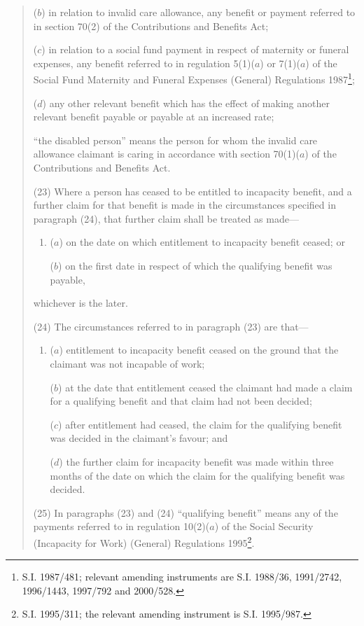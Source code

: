 \documentclass[12pt,a4paper]{article}
\begin{document}
\begin{enumerate}
\begin{quotation}
\begin{enumerate}
\begin{enumerate}
($b$) 
in relation to invalid care allowance, any benefit or payment referred to in section 70(2) of the Contributions and Benefits Act;

($c$) 
in relation to a social fund payment in respect of maternity or funeral expenses, any benefit referred to in regulation 5(1)($a$)  or 7(1)($a$)  of the Social Fund Maternity and Funeral Expenses (General) Regulations 1987\footnote{\frenchspacing S.I. 1987/481; relevant amending instruments are S.I. 1988/36, 1991/2742, 1996/1443, 1997/792 and 2000/528.};

($d$) 
any other relevant benefit which has the effect of making another relevant benefit payable or payable at an increased rate;
\end{enumerate}

“the disabled person” means the person for whom the invalid care allowance claimant is caring in accordance with section 70(1)($a$)  of the Contributions and Benefits Act.
\end{enumerate}

(23) Where a person has ceased to be entitled to incapacity benefit, and a further claim for that benefit is made in the circumstances specified in paragraph (24), that further claim shall be treated as made—
\begin{enumerate}\item[]
($a$) on the date on which entitlement to incapacity benefit ceased; or

($b$) on the first date in respect of which the qualifying benefit was payable,
\end{enumerate}
whichever is the later.

(24) The circumstances referred to in paragraph (23) are that—
\begin{enumerate}\item[]
($a$) entitlement to incapacity benefit ceased on the ground that the claimant was not incapable of work;

($b$) at the date that entitlement ceased the claimant had made a claim for a qualifying benefit and that claim had not been decided;

($c$) after entitlement had ceased, the claim for the qualifying benefit was decided in the claimant’s favour; and

($d$) the further claim for incapacity benefit was made within three months of the date on which the claim for the qualifying benefit was decided.
\end{enumerate}

(25) In paragraphs (23) and (24) “qualifying benefit” means any of the payments referred to in regulation 10(2)($a$)  of the Social Security (Incapacity for Work) (General) Regulations 1995\footnote{\frenchspacing S.I. 1995/311; the relevant amending instrument is S.I. 1995/987.}.


\end{quotation}
\end{enumerate}
\end{document}

